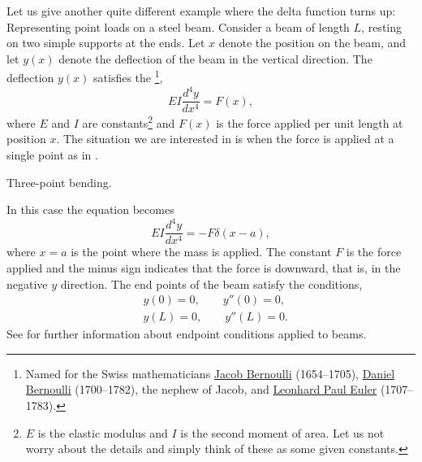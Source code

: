 Let us give another quite different
example where the delta function turns up:
Representing point loads on a steel beam.  Consider a beam
of length $L$, resting on two simple supports at the ends.  Let $x$ denote
the position on the beam, and let $y(x)$ denote the deflection of the beam in
the vertical direction.  The deflection $y(x)$ satisfies the
\emph{}%
\footnote{Named for the Swiss mathematicians
\href{https://en.wikipedia.org/wiki/Jacob_Bernoulli}{Jacob Bernoulli}
(1654--1705),
\href{https://en.wikipedia.org/wiki/Daniel_Bernoulli}{Daniel Bernoulli}
(1700--1782), the nephew of Jacob,
and
\href{https://en.wikipedia.org/wiki/Euler}{Leonhard Paul Euler}
(1707--1783).},
\begin{equation*}
EI \frac{d^4 y}{dx^4} = F(x) ,
\end{equation*}
where $E$ and $I$ are constants\footnote{$E$ is the elastic modulus and $I$
is the second moment of area.  Let us not worry about the details and simply
think of these as some given constants.} and
$F(x)$ is the force applied per unit length at position $x$.  The situation
we are interested in is when the force is applied at a single point as in
.

\begin{myfig}
\capstart
{}
\caption{Three-point bending.\label{lt:beambendingfig}}
\end{myfig}

In this case the equation becomes
\begin{equation*}
EI \frac{d^4 y}{dx^4} = -F \delta(x-a) ,
\end{equation*}
where $x=a$ is the point where the mass is applied.  The constant $F$ is the force
applied and the minus sign indicates that the force is downward, that is, in the
negative $y$ direction.  The end points of the
beam satisfy the conditions,
\begin{align*}
& y(0) = 0, \qquad y''(0) = 0, \\
& y(L) = 0, \qquad y''(L) = 0.
\end{align*}
See  for further information about endpoint
conditions applied to beams.


